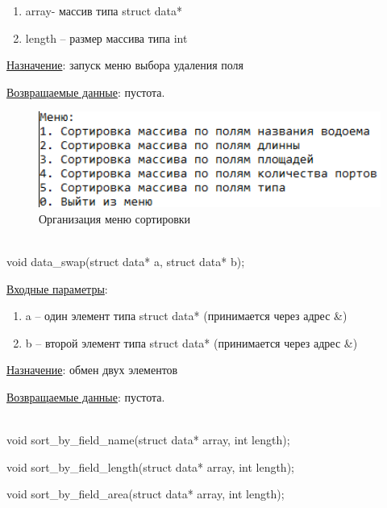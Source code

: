 \begin{enumerate}
    \item array- массив типа struct data*
    \item length – размер массива типа int
\end{enumerate}

\underline{Назначение}: запуск меню выбора удаления поля 

\underline{Возвращаемые данные}: пустота.

\begin{figure}[!hp]
    \begin{center}
        \includegraphics[width=16cm]{../includes_PZ/programmDevelopment/sortmenu.png}
    \end{center}
    \caption{Организация меню сортировки\label{fig:sortmenu}}
\end{figure}

\hspace{0pt}\\



void data\_swap(struct data* a, struct data* b);

\underline{Входные параметры}:

\begin{enumerate}
    \item a – один элемент типа struct data* (принимается через адрес \&)
    \item b – второй элемент типа struct data* (принимается через адрес \&)
\end{enumerate}

\underline{Назначение}: обмен двух элементов 

\underline{Возвращаемые данные}: пустота.

\hspace{0pt}\\



void sort\_by\_field\_name(struct data* array, int length);

void sort\_by\_field\_length(struct data* array, int length);

void sort\_by\_field\_area(struct data* array, int length);

